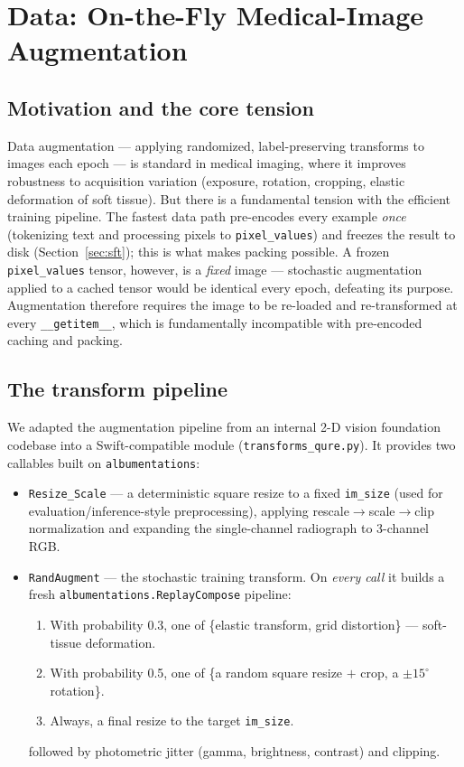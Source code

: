 \documentclass[11pt,a4paper]{article}
\begin{document}
\section{Data: On-the-Fly Medical-Image Augmentation}
\label{sec:augment}

\subsection{Motivation and the core tension}
Data augmentation --- applying randomized, label-preserving transforms to images each epoch --- is standard in medical imaging, where it improves robustness to acquisition variation (exposure, rotation, cropping, elastic deformation of soft tissue). But there is a fundamental tension with the efficient training pipeline. The fastest data path pre-encodes every example \emph{once} (tokenizing text and processing pixels to \texttt{pixel\_values}) and freezes the result to disk (Section~\ref{sec:sft}); this is what makes packing possible. A frozen \texttt{pixel\_values} tensor, however, is a \emph{fixed} image --- stochastic augmentation applied to a cached tensor would be identical every epoch, defeating its purpose. Augmentation therefore requires the image to be re-loaded and re-transformed at every \texttt{\_\_getitem\_\_}, which is fundamentally incompatible with pre-encoded caching and packing.

\subsection{The transform pipeline}
We adapted the augmentation pipeline from an internal 2-D vision foundation codebase into a Swift-compatible module (\texttt{transforms\_qure.py}). It provides two callables built on \texttt{albumentations}:
\begin{itemize}[leftmargin=1.4em]
  \item \texttt{Resize\_Scale} --- a deterministic square resize to a fixed \texttt{im\_size} (used for evaluation/inference-style preprocessing), applying rescale$\rightarrow$scale$\rightarrow$clip normalization and expanding the single-channel radiograph to 3-channel RGB.
  \item \texttt{RandAugment} --- the stochastic training transform. On \emph{every call} it builds a fresh \texttt{albumentations.ReplayCompose} pipeline:
  \begin{enumerate}[leftmargin=1.6em]
    \item With probability 0.3, one of \{elastic transform, grid distortion\} --- soft-tissue deformation.
    \item With probability 0.5, one of \{a random square resize $+$ crop, a $\pm 15^{\circ}$ rotation\}.
    \item Always, a final resize to the target \texttt{im\_size}.
  \end{enumerate}
  followed by photometric jitter (gamma, brightness, contrast) and clipping.
\end{itemize}
\end{document}
